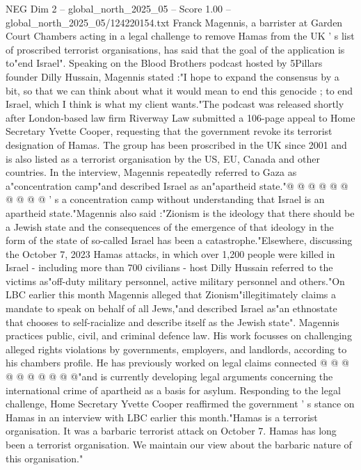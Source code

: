 \begin{textsample}{NEG Dim 2 – global\_north\_2025\_05 – Score 1.00 – global\_north\_2025\_05/124220154.txt}  \label{ex:f2_neg_041}
Franck Magennis, a barrister at Garden Court Chambers acting in a legal challenge to remove Hamas from the UK ' s list of proscribed terrorist organisations, has said that the goal of the application is to"end Israel".
Speaking on the Blood Brothers podcast hosted by 5Pillars founder Dilly Hussain, Magennis stated :"I hope to expand the consensus by a bit, so that we can think about what it would mean to end this genocide ; to end Israel, which I think is what my client wants."The podcast was released shortly after London-based law firm Riverway Law submitted a 106-page appeal to Home Secretary Yvette Cooper, requesting that the government revoke its terrorist designation of Hamas.
The group has been proscribed in the UK since 2001 and is also listed as a terrorist organisation by the US, EU, Canada and other countries.
In the interview, Magennis repeatedly referred to Gaza as a"concentration camp"and described Israel as an"apartheid state."@ @ @ @ @ @ @ @ @ @ ' s a concentration camp without understanding that Israel is an apartheid state."Magennis also said :"Zionism is the ideology that there should be a Jewish state and the consequences of the emergence of that ideology in the form of the state of so-called Israel has been a catastrophe."Elsewhere, discussing the October 7, 2023 Hamas attacks, in which over 1,200 people were killed in Israel - including more than 700 civilians - host Dilly Hussain referred to the victims as"off-duty military personnel, active military personnel and others."On LBC earlier this month Magennis alleged that Zionism"illegitimately claims a mandate to speak on behalf of all Jews,"and described Israel as"an ethnostate that chooses to self-racialize and describe itself as the Jewish state".
Magennis practices public, civil, and criminal defence law.
His work focusses on challenging alleged rights violations by governments, employers, and landlords, according to his chambers profile.
He has previously worked on legal claims connected @ @ @ @ @ @ @ @ @ @"and is currently developing legal arguments concerning the international crime of apartheid as a basis for asylum.
Responding to the legal challenge, Home Secretary Yvette Cooper reaffirmed the government ' s stance on Hamas in an interview with LBC earlier this month."Hamas is a terrorist organisation.
It was a barbaric terrorist attack on October 7.
Hamas has long been a terrorist organisation.
We maintain our view about the barbaric nature of this organisation."

\end{textsample}
